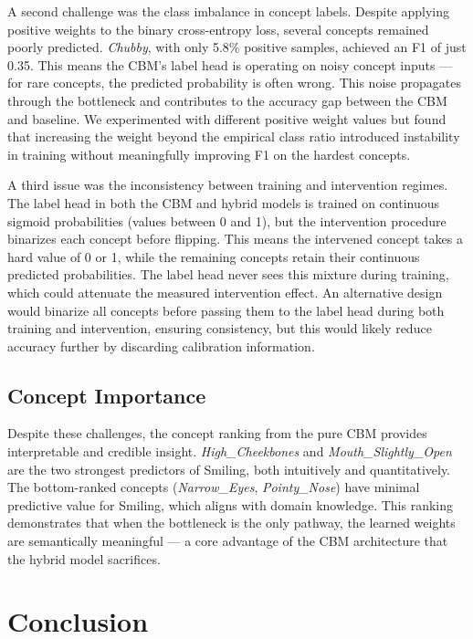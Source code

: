 \documentclass[11pt,a4paper]{article}
\begin{document}
A second challenge was the class imbalance in concept labels. Despite applying positive weights to the binary cross-entropy loss, several concepts remained poorly predicted. \emph{Chubby}, with only 5.8\% positive samples, achieved an F1 of just 0.35. This means the CBM's label head is operating on noisy concept inputs --- for rare concepts, the predicted probability is often wrong. This noise propagates through the bottleneck and contributes to the accuracy gap between the CBM and baseline. We experimented with different positive weight values but found that increasing the weight beyond the empirical class ratio introduced instability in training without meaningfully improving F1 on the hardest concepts.

A third issue was the inconsistency between training and intervention regimes. The label head in both the CBM and hybrid models is trained on continuous sigmoid probabilities (values between 0 and 1), but the intervention procedure binarizes each concept before flipping. This means the intervened concept takes a hard value of 0 or 1, while the remaining concepts retain their continuous predicted probabilities. The label head never sees this mixture during training, which could attenuate the measured intervention effect. An alternative design would binarize all concepts before passing them to the label head during both training and intervention, ensuring consistency, but this would likely reduce accuracy further by discarding calibration information.

\subsection{Concept Importance}

Despite these challenges, the concept ranking from the pure CBM provides interpretable and credible insight. \emph{High\_Cheekbones} and \emph{Mouth\_Slightly\_Open} are the two strongest predictors of Smiling, both intuitively and quantitatively. The bottom-ranked concepts (\emph{Narrow\_Eyes}, \emph{Pointy\_Nose}) have minimal predictive value for Smiling, which aligns with domain knowledge. This ranking demonstrates that when the bottleneck is the only pathway, the learned weights are semantically meaningful --- a core advantage of the CBM architecture that the hybrid model sacrifices.


\section{Conclusion}
\end{document}
